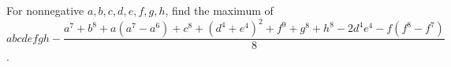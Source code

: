 For nonnegative $a,b,c,d,e,f,g,h$, find the maximum of $abcdefgh-\dfrac{a^7+b^8+a(a^7-a^6)+c^8+(d^4+e^4)^2+f^9+g^8+h^8-2d^4e^4-f(f^8-f^7)}{8}$.
